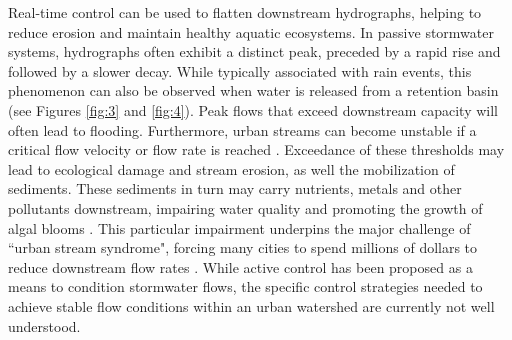 Real-time control can be used to flatten downstream hydrographs, helping to reduce erosion and maintain healthy aquatic ecosystems. In passive stormwater systems, hydrographs often exhibit a distinct peak, preceded by a rapid rise and followed by a slower decay. While typically associated with rain events, this phenomenon can also be observed when water is released from a retention basin (see Figures \ref{fig:3} and \ref{fig:4}). Peak flows that exceed downstream capacity will often lead to flooding. Furthermore, urban streams can become unstable if a critical flow velocity or flow rate is reached \citep{bledsoe2002stream}. Exceedance of these thresholds may lead to ecological damage and stream erosion, as well the mobilization of sediments. These sediments in turn may carry nutrients, metals and other pollutants downstream, impairing water quality and promoting the growth of algal blooms \cite{Michalak2013}. This particular impairment underpins the major challenge of ``urban stream syndrome", forcing many cities to spend millions of dollars to reduce downstream flow rates \cite{schilling2008greening, wise2008green}. 
While active control has been proposed as a means to condition stormwater flows, the specific control strategies needed to achieve stable flow conditions within an urban watershed are currently not well understood.
	
